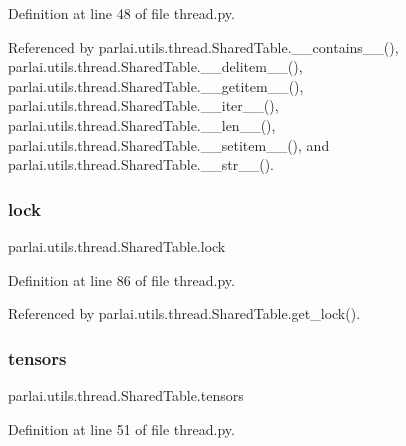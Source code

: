 Definition at line 48 of file thread.\+py.



Referenced by parlai.\+utils.\+thread.\+Shared\+Table.\+\_\+\+\_\+contains\+\_\+\+\_\+(), parlai.\+utils.\+thread.\+Shared\+Table.\+\_\+\+\_\+delitem\+\_\+\+\_\+(), parlai.\+utils.\+thread.\+Shared\+Table.\+\_\+\+\_\+getitem\+\_\+\+\_\+(), parlai.\+utils.\+thread.\+Shared\+Table.\+\_\+\+\_\+iter\+\_\+\+\_\+(), parlai.\+utils.\+thread.\+Shared\+Table.\+\_\+\+\_\+len\+\_\+\+\_\+(), parlai.\+utils.\+thread.\+Shared\+Table.\+\_\+\+\_\+setitem\+\_\+\+\_\+(), and parlai.\+utils.\+thread.\+Shared\+Table.\+\_\+\+\_\+str\+\_\+\+\_\+().

\mbox{\label{classparlai_1_1utils_1_1thread_1_1SharedTable_aa9c342b24e24a93c40950671a326d014}} 
\subsubsection{\texorpdfstring{lock}{lock}}
{\footnotesize\ttfamily parlai.\+utils.\+thread.\+Shared\+Table.\+lock}



Definition at line 86 of file thread.\+py.



Referenced by parlai.\+utils.\+thread.\+Shared\+Table.\+get\+\_\+lock().

\mbox{\label{classparlai_1_1utils_1_1thread_1_1SharedTable_ad1a6839c09b909c73c7b57ece300d4d4}} 
\subsubsection{\texorpdfstring{tensors}{tensors}}
{\footnotesize\ttfamily parlai.\+utils.\+thread.\+Shared\+Table.\+tensors}



Definition at line 51 of file thread.\+py.



